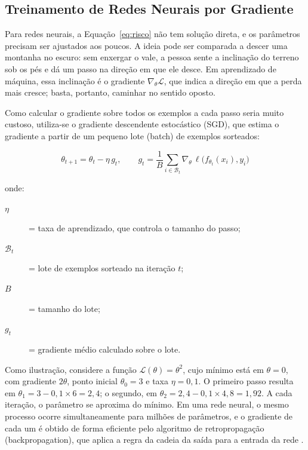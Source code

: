 \subsection{Treinamento de Redes Neurais por Gradiente} \label{sec:gradiente}

Para redes neurais, a Equação~\ref{eq:risco} não tem solução direta, e os parâmetros precisam ser ajustados aos poucos. A ideia pode ser comparada a descer uma montanha no escuro: sem enxergar o vale, a pessoa sente a inclinação do terreno sob os pés e dá um passo na direção em que ele desce. Em aprendizado de máquina, essa inclinação é o gradiente $\nabla_\theta \mathcal{L}$, que indica a direção em que a perda mais cresce; basta, portanto, caminhar no sentido oposto.

Como calcular o gradiente sobre todos os exemplos a cada passo seria muito custoso, utiliza-se o gradiente descendente estocástico (SGD), que estima o gradiente a partir de um pequeno lote (batch) de exemplos sorteados:

\begin{equation} \label{eq:sgd}
\theta_{t+1} = \theta_t - \eta \, g_t, \qquad g_t = \frac{1}{B} \sum_{i \in \mathcal{B}_t} \nabla_\theta \, \ell\big(f_{\theta_t}(x_i), y_i\big)
\end{equation}

\noindent onde:
\begin{description}
  \item[$\eta$] = taxa de aprendizado, que controla o tamanho do passo;
  \item[$\mathcal{B}_t$] = lote de exemplos sorteado na iteração $t$;
  \item[$B$] = tamanho do lote;
  \item[$g_t$] = gradiente médio calculado sobre o lote.
\end{description}

Como ilustração, considere a função $\mathcal{L}(\theta) = \theta^2$, cujo mínimo está em $\theta = 0$, com gradiente $2\theta$, ponto inicial $\theta_0 = 3$ e taxa $\eta = 0{,}1$. O primeiro passo resulta em $\theta_1 = 3 - 0{,}1 \times 6 = 2{,}4$; o segundo, em $\theta_2 = 2{,}4 - 0{,}1 \times 4{,}8 = 1{,}92$. A cada iteração, o parâmetro se aproxima do mínimo. Em uma rede neural, o mesmo processo ocorre simultaneamente para milhões de parâmetros, e o gradiente de cada um é obtido de forma eficiente pelo algoritmo de retropropagação (backpropagation), que aplica a regra da cadeia da saída para a entrada da rede \cite{Rumelhart1986}.

